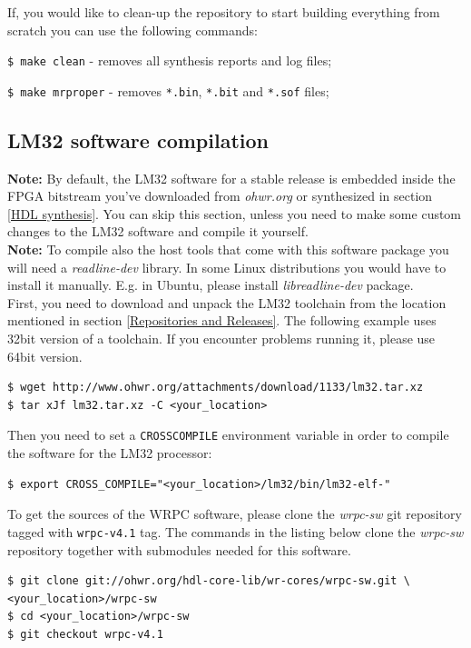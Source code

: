 \documentclass[a4paper, 12pt]{article}
\renewcommand{\_}{\underscore\allowbreak}
\begin{document}
If, you would like to clean-up the repository to start building everything from
scratch you can use the following commands:
\begin{itemize*}
\item \texttt{\$ make clean} - removes all synthesis reports and log files;
\item \texttt{\$ make mrproper} - removes \texttt{*.bin}, \texttt{*.bit} and
  \texttt{*.sof} files;
\end{itemize*}

\subsection{LM32 software compilation}
\label{LM32 software compilation}

\textbf{Note:} By default, the LM32 software for a stable release is embedded
inside the FPGA bitstream you've downloaded from \textit{ohwr.org} or
synthesized in section \ref{HDL synthesis}. You can skip this section, unless
you need to make some custom changes to the LM32 software and compile it
yourself.\\

\textbf{Note:} To compile also the host tools that come with this software
package you will need a \emph{readline-dev} library. In some Linux distributions
you would have to install it manually. E.g. in Ubuntu, please install
\emph{libreadline-dev} package.\\

First, you need to download and unpack the LM32 toolchain from the location
mentioned in section \ref{Repositories and Releases}. The following example
uses 32bit version of a toolchain. If you encounter problems running it, please
use 64bit version.
\begin{lstlisting}
$ wget http://www.ohwr.org/attachments/download/1133/lm32.tar.xz
$ tar xJf lm32.tar.xz -C <your_location>
\end{lstlisting}

Then you need to set a \texttt{CROSS\_COMPILE} environment variable in order
to compile the software for the LM32 processor:
\begin{lstlisting}
$ export CROSS_COMPILE="<your_location>/lm32/bin/lm32-elf-"
\end{lstlisting}

To get the sources of the WRPC software, please clone the \textit{wrpc-sw} git
repository tagged with \texttt{wrpc-v4.1} tag. The commands in the listing below
clone the \textit{wrpc-sw} repository together with submodules needed for this software.\\
\begin{lstlisting}
$ git clone git://ohwr.org/hdl-core-lib/wr-cores/wrpc-sw.git \
<your_location>/wrpc-sw
$ cd <your_location>/wrpc-sw
$ git checkout wrpc-v4.1
\end{lstlisting}
\end{document}
